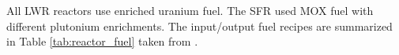 \documentclass[12pt]{article}
\begin{document}
%


All LWR reactors use enriched uranium fuel. The SFR used MOX fuel with
different plutonium enrichments. The input/output fuel recipes are summarized
in Table \ref{tab:reactor_fuel} taken from \cite{B.Feng_calculation}.
\end{document}
